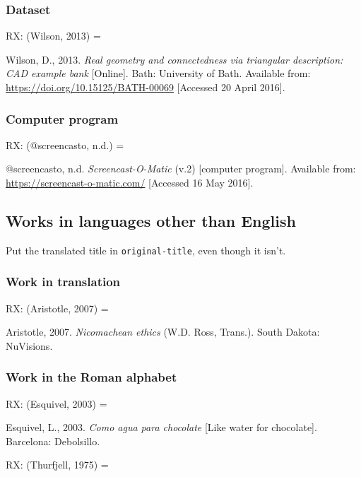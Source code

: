 \subsubsection*{Dataset}

RX: (Wilson, 2013) = \cite{wilson2013rgc}

Wilson, D., 2013. \emph{Real geometry and connectedness via triangular description: CAD example bank} [Online]. Bath: University of Bath. Available from: \url{https://doi.org/10.15125/BATH-00069} [Accessed 20 April 2016].



\subsubsection*{Computer program}

RX: (@screencasto, n.d.) = \cite{screencasto}

@screencasto, n.d. \emph{Screencast-O-Matic} (v.2) [computer program]. Available from: \url{https://screencast-o-matic.com/} [Accessed 16 May 2016].



\subsection{Works in languages other than English}

Put the translated title in \texttt{original-title}, even though it isn't.

\subsubsection*{Work in translation}

RX: (Aristotle, 2007) = \cite{aristotle2007ne}

Aristotle, 2007. \emph{Nicomachean ethics} (W.D. Ross, Trans.). South Dakota: NuVisions.



\subsubsection*{Work in the Roman alphabet}

RX: (Esquivel, 2003) = \cite{esquivel2003cap}

Esquivel, L., 2003. \emph{Como agua para chocolate} [Like water for chocolate]. Barcelona: Debolsillo.



RX: (Thurfjell, 1975) = \cite{thurfjell1975vhv}

